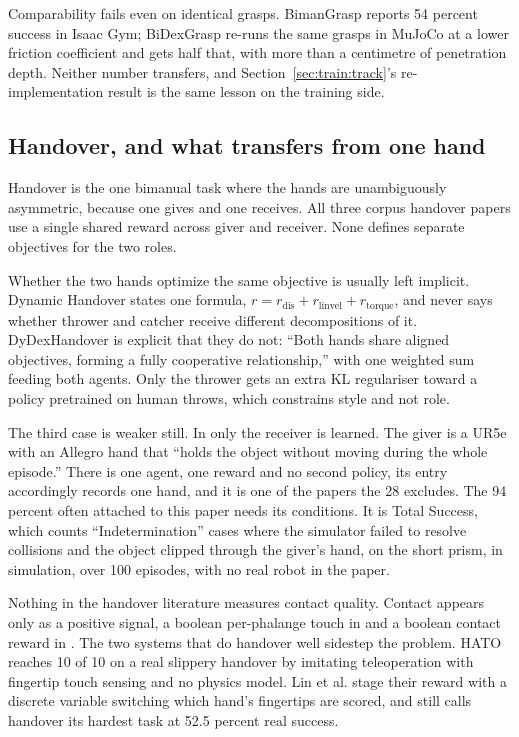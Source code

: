 Comparability fails even on identical grasps. BimanGrasp \cite{bimangrasp_2024} reports 54
percent success in Isaac Gym; BiDexGrasp \cite{bidexgrasp_2026} re-runs the same grasps in MuJoCo
at a lower friction coefficient and gets half that, with more than a centimetre of penetration
depth. Neither number transfers, and Section~\ref{sec:train:track}'s re-implementation result is
the same lesson on the training side.

\subsection{Handover, and what transfers from one hand}
\label{subsec:handover}
Handover is the one bimanual task where the hands are unambiguously asymmetric, because one gives
and one receives. All three corpus handover papers use a single shared reward across giver and
receiver. None defines separate objectives for the two roles.

Whether the two hands optimize the same objective is usually left implicit. Dynamic Handover
\cite{dynamic_handover_2023} states one formula, $r = r_{\mathrm{dis}} + r_{\mathrm{linvel}} +
r_{\mathrm{torque}}$, and never says whether thrower and catcher receive different
decompositions of it. DyDexHandover \cite{dydexhandover_2025} is explicit that they do not:
``Both hands share aligned objectives, forming a fully cooperative relationship,'' with one
weighted sum feeding both agents. Only the thrower gets an extra KL regulariser toward a policy
pretrained on human throws, which constrains style and not role.

The third case is weaker still. In \cite{dexterous_handover_2025} only the receiver is learned.
The giver is a UR5e with an Allegro hand that ``holds the object without moving during the whole
episode.'' There is one agent, one reward and no second policy, its entry accordingly records
one hand, and it is one of the papers the 28 excludes. The 94 percent often attached to this paper
needs its conditions. It is Total Success, which counts ``Indetermination'' cases where the
simulator failed to resolve collisions and the object clipped through the giver's hand, on the
short prism, in simulation, over 100 episodes, with no real robot in the paper.

Nothing in the handover literature measures contact quality. Contact appears only as a positive
signal, a boolean per-phalange touch in \cite{dexterous_handover_2025} and a boolean contact
reward in \cite{dydexhandover_2025}. The two systems that do handover well sidestep the problem.
HATO \cite{hato_visuotactile_2024} reaches 10 of 10 on a real slippery handover by imitating
teleoperation with fingertip touch sensing and no physics model. Lin et al.
\cite{humanoid_sim2real_recipe_2025} stage their reward with a discrete variable switching which
hand's fingertips are scored, and still calls handover its hardest task at 52.5 percent real
success.

